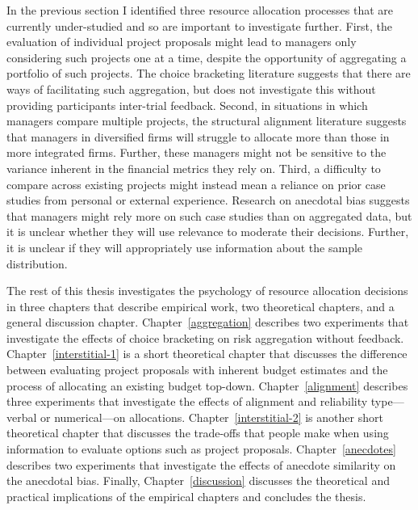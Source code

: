 \documentclass[a4paper, nobind, dvipsnames]{templates/ociamthesis}
\theoremstyle{definition}
\theoremstyle{definition}
\theoremstyle{definition}
\theoremstyle{definition}
\theoremstyle{remark}
\begin{document}
In the previous section I identified three resource allocation processes that
are currently under-studied and so are important to investigate further. First,
the evaluation of individual project proposals might lead to managers only
considering such projects one at a time, despite the opportunity of aggregating
a portfolio of such projects. The choice bracketing literature suggests that
there are ways of facilitating such aggregation, but does not investigate this
without providing participants inter-trial feedback. Second, in situations in
which managers compare multiple projects, the structural alignment literature
suggests that managers in diversified firms will struggle to allocate more than
those in more integrated firms. Further, these managers might not be sensitive
to the variance inherent in the financial metrics they rely on. Third, a
difficulty to compare across existing projects might instead mean a reliance on
prior case studies from personal or external experience. Research on anecdotal
bias suggests that managers might rely more on such case studies than on
aggregated data, but it is unclear whether they will use relevance to moderate
their decisions. Further, it is unclear if they will appropriately use
information about the sample distribution.

The rest of this thesis investigates the psychology of resource allocation
decisions in three chapters that describe empirical work, two theoretical
chapters, and a general discussion chapter. Chapter~\ref{aggregation} describes
two experiments that investigate the effects of choice bracketing on risk
aggregation without feedback. Chapter~\ref{interstitial-1} is a short
theoretical chapter that discusses the difference between evaluating project
proposals with inherent budget estimates and the process of allocating an
existing budget top-down. Chapter~\ref{alignment} describes three experiments
that investigate the effects of alignment and reliability type---verbal or
numerical---on allocations. Chapter~\ref{interstitial-2} is another short
theoretical chapter that discusses the trade-offs that people make when using
information to evaluate options such as project proposals.
Chapter~\ref{anecdotes} describes two experiments that investigate the effects
of anecdote similarity on the anecdotal bias. Finally, Chapter~\ref{discussion}
discusses the theoretical and practical implications of the empirical chapters
and concludes the thesis.

\newpage

\printbibliography[segment=\therefsegment,heading=subbibintoc]
\end{document}

